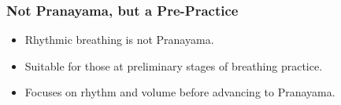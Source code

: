 \begin{frame}[fragile]\frametitle{Not Pranayama, but a Pre-Practice}
    \begin{itemize}
        \item Rhythmic breathing is not Pranayama.
        \item Suitable for those at preliminary stages of breathing practice.
        \item Focuses on rhythm and volume before advancing to Pranayama.
    \end{itemize}
\end{frame}
